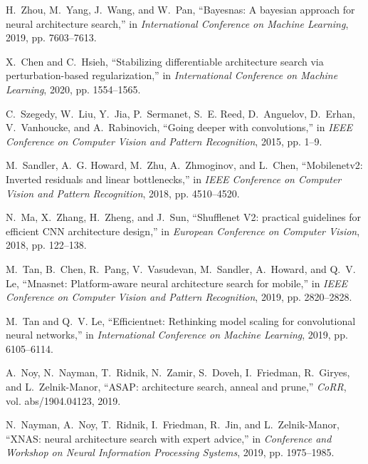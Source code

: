 \documentclass[journal]{IEEEtran}
\begin{document}
\begin{thebibliography}{10}
H.~Zhou, M.~Yang, J.~Wang, and W.~Pan, ``Bayesnas: {A} bayesian approach for
  neural architecture search,'' in \emph{International Conference on Machine
  Learning}, 2019, pp. 7603--7613.

X.~Chen and C.~Hsieh, ``Stabilizing differentiable architecture search via
  perturbation-based regularization,'' in \emph{International Conference on
  Machine Learning}, 2020, pp. 1554--1565.

C.~Szegedy, W.~Liu, Y.~Jia, P.~Sermanet, S.~E. Reed, D.~Anguelov, D.~Erhan,
  V.~Vanhoucke, and A.~Rabinovich, ``Going deeper with convolutions,'' in
  \emph{IEEE Conference on Computer Vision and Pattern Recognition}, 2015, pp.
  1--9.

M.~Sandler, A.~G. Howard, M.~Zhu, A.~Zhmoginov, and L.~Chen, ``Mobilenetv2:
  Inverted residuals and linear bottlenecks,'' in \emph{IEEE Conference on
  Computer Vision and Pattern Recognition}, 2018, pp. 4510--4520.

N.~Ma, X.~Zhang, H.~Zheng, and J.~Sun, ``Shufflenet {V2:} practical guidelines
  for efficient {CNN} architecture design,'' in \emph{European Conference on
  Computer Vision}, 2018, pp. 122--138.

M.~Tan, B.~Chen, R.~Pang, V.~Vasudevan, M.~Sandler, A.~Howard, and Q.~V. Le,
  ``Mnasnet: Platform-aware neural architecture search for mobile,'' in
  \emph{IEEE Conference on Computer Vision and Pattern Recognition}, 2019, pp.
  2820--2828.

M.~Tan and Q.~V. Le, ``Efficientnet: Rethinking model scaling for convolutional
  neural networks,'' in \emph{International Conference on Machine Learning},
  2019, pp. 6105--6114.

A.~Noy, N.~Nayman, T.~Ridnik, N.~Zamir, S.~Doveh, I.~Friedman, R.~Giryes, and
  L.~Zelnik{-}Manor, ``{ASAP:} architecture search, anneal and prune,''
  \emph{CoRR}, vol. abs/1904.04123, 2019.

N.~Nayman, A.~Noy, T.~Ridnik, I.~Friedman, R.~Jin, and L.~Zelnik{-}Manor,
  ``{XNAS:} neural architecture search with expert advice,'' in
  \emph{Conference and Workshop on Neural Information Processing Systems},
  2019, pp. 1975--1985.

\end{thebibliography}
\end{document}
